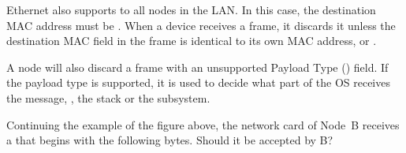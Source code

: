 Ethernet also supports  to all nodes in the LAN. In this case, the destination
MAC address must be .
% 
When a device receives a frame, it discards it unless the destination MAC field in the frame
is identical to its own MAC address, or . 

A node will also discard a frame with an unsupported Payload Type () field. 
% 
If the payload type is supported, it is used to decide what part of the OS receives the message,
\eg, the  stack or the  subsystem.

\begin{exercise} Continuing the example of the figure above, the network card of Node~B receives
a  that begins with the following bytes. Should it be accepted by B?
\begin{center}
\end{center}
\end{exercise}

